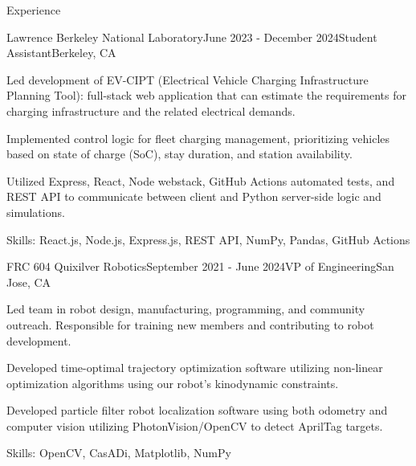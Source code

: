 \documentclass[
	11pt, %
]{tex/resume} %
\begin{document}
\begin{rSection}{Experience}

	\begin{rSubsection}{Lawrence Berkeley National Laboratory}{June 2023 - December 2024}{Student Assistant}{Berkeley, CA}
		\item Led development of EV-CIPT (Electrical Vehicle Charging Infrastructure Planning Tool): full-stack web application that can estimate the requirements for charging infrastructure and the related electrical demands.
        \item Implemented control logic for fleet charging management, prioritizing vehicles based on state of charge (SoC), stay duration, and station availability.
        \item Utilized Express, React, Node webstack, GitHub Actions automated tests, and REST API to communicate between client and Python server-side logic and simulations.
        \item Skills: React.js, Node.js, Express.js, REST API, NumPy, Pandas, GitHub Actions
        
	\end{rSubsection}


	\begin{rSubsection}{FRC 604 Quixilver Robotics}{September 2021 - June 2024}{VP of Engineering}{San Jose, CA}
		\item Led team in robot design, manufacturing, programming, and community outreach. Responsible for training new members and contributing to robot development.
        \item Developed time-optimal trajectory optimization software utilizing non-linear optimization algorithms using our robot’s kinodynamic constraints.
        \item Developed particle filter robot localization software using both odometry and computer vision utilizing PhotonVision/OpenCV to detect AprilTag targets.
        \item Skills: OpenCV, CasADi, Matplotlib, NumPy
        
	\end{rSubsection}





\end{rSection}

\end{document}
